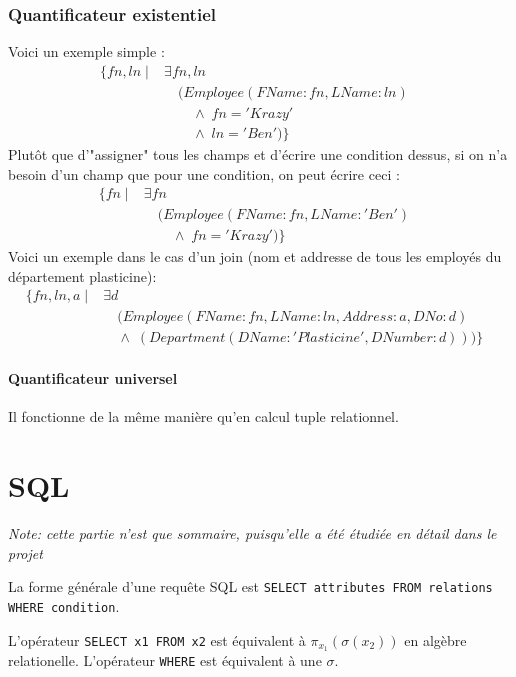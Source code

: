 \documentclass[a4paper]{article}
\begin{document}
  \subsubsection{Quantificateur existentiel}
  Voici un exemple simple :
  \begin{align*}
    \{fn, ln\; |\; &\exists fn, ln & \\
    &\quad(Employee(FName:fn, LName:ln)\\
    &\quad\quad\land\;fn='Krazy'\\
    &\quad\quad\land\; ln='Ben')\}
  \end{align*}
  Plutôt que d'"assigner" tous les champs et d'écrire une condition dessus,
  si on n'a besoin d'un champ que pour une condition, on peut écrire ceci :
  \begin{align*}
    \{fn\; |\; &\exists fn & \\
    &\quad(Employee(FName:fn, LName:'Ben')\\
    &\quad\quad\land\;fn='Krazy')\}
  \end{align*}
  Voici un exemple dans le cas d'un join (nom et addresse de tous les employés
  du département plasticine):
  \begin{align*}
    \{fn, ln, a\; |\; &\exists d & \\
    &\quad(Employee(FName:fn, LName:ln, Address:a, DNo:d)\\
    &\quad\land\;(Department(DName:'Plasticine', DNumber:d)))\}
  \end{align*}

  \paragraph{Quantificateur universel}
  Il fonctionne de la même manière qu'en calcul tuple relationnel.


\section{SQL}
\textit{Note: cette partie n'est que sommaire, puisqu'elle a été étudiée en détail dans le projet}

La forme générale d'une requête SQL est \texttt{SELECT attributes FROM relations WHERE condition}.

L'opérateur \texttt{SELECT x1 FROM x2} est équivalent à $\pi_{x_1}(\sigma(x_2))$ en algèbre relationelle.
L'opérateur \texttt{WHERE} est équivalent à une $\sigma$.
\end{document}
